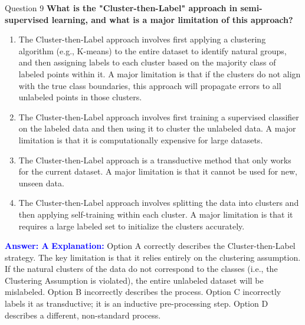 \documentclass{beamer}
\begin{document}
	\begin{frame}{Question 9}
		\textbf{What is the "Cluster-then-Label" approach in semi-supervised learning, and what is a major limitation of this approach?}
		\begin{enumerate}
			\item The Cluster-then-Label approach involves first applying a clustering algorithm (e.g., K-means) to the entire dataset to identify natural groups, and then assigning labels to each cluster based on the majority class of labeled points within it. A major limitation is that if the clusters do not align with the true class boundaries, this approach will propagate errors to all unlabeled points in those clusters.
			\item The Cluster-then-Label approach involves first training a supervised classifier on the labeled data and then using it to cluster the unlabeled data. A major limitation is that it is computationally expensive for large datasets.
			\item The Cluster-then-Label approach is a transductive method that only works for the current dataset. A major limitation is that it cannot be used for new, unseen data.
			\item The Cluster-then-Label approach involves splitting the data into clusters and then applying self-training within each cluster. A major limitation is that it requires a large labeled set to initialize the clusters accurately.
		\end{enumerate}
		\vspace{0.2cm}
		\textcolor{blue}{\textbf{Answer: A}}
		\vspace{0.2cm}
		\textcolor{blue}{\textbf{Explanation:}} Option A correctly describes the Cluster-then-Label strategy. The key limitation is that it relies entirely on the clustering assumption. If the natural clusters of the data do not correspond to the classes (i.e., the Clustering Assumption is violated), the entire unlabeled dataset will be mislabeled. Option B incorrectly describes the process. Option C incorrectly labels it as transductive; it is an inductive pre-processing step. Option D describes a different, non-standard process.
	\end{frame}
	
\end{document}
